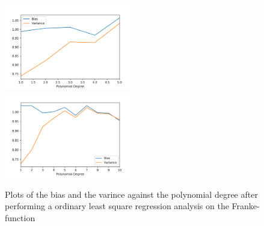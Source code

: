 \documentclass[a4paper,10pt,english]{article}
\begin{document}




\begin{figure}[H]
	\centering 
	\includegraphics[width = 0.5\textwidth, center]{../franke_output/part_C_1.png}
	\includegraphics[width = 0.5\textwidth, center]{../franke_output/part_C_1_highdeg.png}
	\caption{
		Plots of the bias and the varince against the polynomial degree after performing a ordinary least square regression analysis on the Franke-function
	}
	\label{part_c1}
\end{figure}
\end{document}

